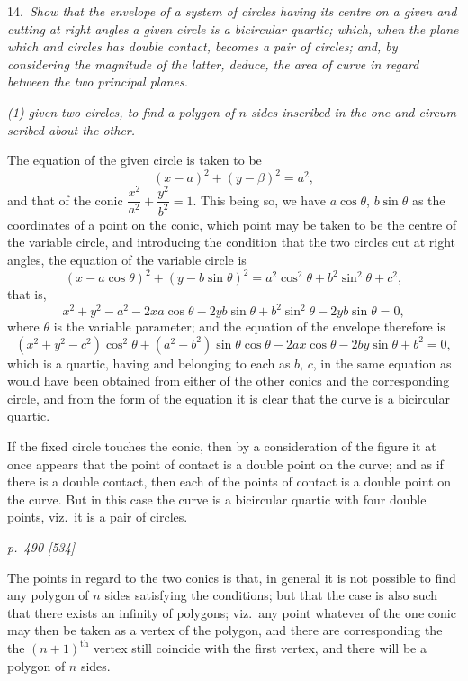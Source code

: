 \documentclass[11pt,a4paper]{book}
\begin{document}
\smallskip
\noindent\textsc{14.}\, \textit{Show that the envelope of a system of circles having its centre on a given
and cutting at right angles a given circle is a bicircular quartic; which, when the plane
which and circles has double contact, becomes a pair of circles; and, by considering
the magnitude of the latter, deduce, the area of curve in regard between
the two principal planes.}

\textit{(1) given two circles, to find a polygon of $n$ sides inscribed in the one and circum-
scribed about the other.}

The equation of the given circle is taken to be
\[
(x - a)^2 + (y - \beta)^2 = a^2,
\]
and that of the conic $\dfrac{x^2}{a^2} + \dfrac{y^2}{b^2} = 1$. This being so, we have $a\cos\theta$, $b\sin\theta$ as the
coordinates of a point on the conic, which point may be taken to be the centre of
the variable circle, and introducing the condition that the two circles cut at right
angles, the equation of the variable circle is
\[
(x - a\cos\theta)^2 + (y - b\sin\theta)^2 = a^2\cos^2\theta + b^2\sin^2\theta + c^2,
\]
that is,
\[
x^2 + y^2 - a^2 - 2x a\cos\theta - 2y b\sin\theta + b^2\sin^2\theta - 2y b\sin\theta = 0,
\]
where $\theta$ is the variable parameter; and the equation of the envelope therefore is
\[
(x^2 + y^2 - c^2)\cos^2\theta + (a^2 - b^2)\sin\theta\cos\theta - 2ax\cos\theta - 2by\sin\theta + b^2 = 0,
\]
which is a quartic, having and belonging to each as $b$, $c$, in the same equation as would
have been obtained from either of the other conics and the corresponding circle, and
from the form of the equation it is clear that the curve is a bicircular quartic.

If the fixed circle touches the conic, then by a consideration of the figure it at
once appears that the point of contact is a double point on the curve; and as if
there is a double contact, then each of the points of contact is a double point on
the curve. But in this case the curve is a bicircular quartic with four double points,
viz.\ it is a pair of circles.

\clearpage

\bigskip
\textit{p.~490 [534]}
\smallskip

\noindent
The points in regard to the two conics is that, in general it is not possible to
find any polygon of $n$ sides satisfying the conditions; but that the case is also
such that there exists an infinity of polygons; viz.\ any point whatever of the one
conic may then be taken as a vertex of the polygon, and there are corresponding the
the $(n+1)^{\text{th}}$ vertex still coincide with the first vertex, and there will be a polygon of
$n$ sides.
\end{document}
